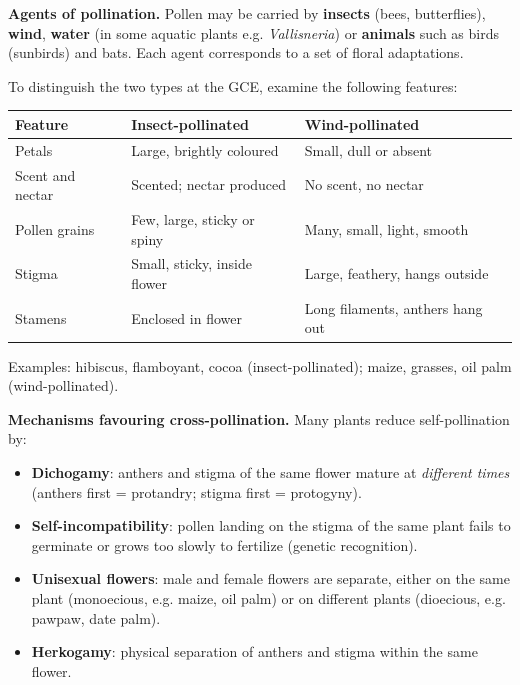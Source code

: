 \documentclass[11pt]{article}
\newcommand{\cle}[1]{{\popxbold\color{popdark}#1}}
\begin{document}
\textbf{Agents of pollination.} Pollen may be carried by \textbf{insects} (bees, butterflies), \textbf{wind}, \textbf{water} (in some aquatic plants e.g. \emph{Vallisneria}) or \textbf{animals} such as birds (sunbirds) and bats. Each agent corresponds to a set of floral adaptations.

\begin{methode}
To distinguish the two types at the GCE, examine the following features:
\begin{center}
\begin{tabularx}{\linewidth}{|l|X|X|}
\hline
\rowcolor{popblueL} \textbf{Feature} & \textbf{Insect-pollinated} & \textbf{Wind-pollinated} \\
\hline
Petals & Large, brightly coloured & Small, dull or absent \\
\hline
Scent and nectar & Scented; nectar produced & No scent, no nectar \\
\hline
Pollen grains & Few, large, sticky or spiny & Many, small, light, smooth \\
\hline
Stigma & Small, sticky, inside flower & Large, feathery, hangs outside \\
\hline
Stamens & Enclosed in flower & Long filaments, anthers hang out \\
\hline
\end{tabularx}
\end{center}
Examples: hibiscus, flamboyant, cocoa (insect-pollinated); maize, grasses, oil palm (wind-pollinated).
\end{methode}

\textbf{Mechanisms favouring cross-pollination.} Many plants reduce self-pollination by:

\begin{itemize}
\item \textbf{Dichogamy}: anthers and stigma of the same flower mature at \emph{different times} (anthers first = \cle{protandry}; stigma first = \cle{protogyny}).
\item \textbf{Self-incompatibility}: pollen landing on the stigma of the same plant fails to germinate or grows too slowly to fertilize (genetic recognition).
\item \textbf{Unisexual flowers}: male and female flowers are separate, either on the same plant (\cle{monoecious}, e.g. maize, oil palm) or on different plants (\cle{dioecious}, e.g. pawpaw, date palm).
\item \textbf{Herkogamy}: physical separation of anthers and stigma within the same flower.
\end{itemize}
\end{document}
